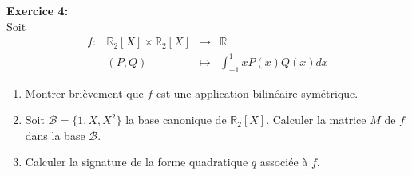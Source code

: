 \documentclass[a4paper, 11pt]{article}
\theoremstyle{plain}
\newcommand{\R}{\mathbb{R}}
\begin{document}
\bigskip
\noindent
\textbf{Exercice 4:}\\
Soit 
\[
\begin{array}{cccc}
f : & \R_2[X]\times \R_2[X] & \to & \R \\
    &  (P,Q)  & \mapsto & \int_{-1}^1 xP(x)Q(x)dx
    \end{array}
    \]
    
\begin{enumerate}
\item 
Montrer brièvement que $f$ est une application bilinéaire symétrique.
\item 
Soit $\mathcal{B} = \{ 1,X,X^2\}$ la base canonique de $ \R_2[X]$. Calculer la matrice $M$ de 
$f$ dans la base $\mathcal{B}$.
\item Calculer la signature de la forme quadratique $q$ associée à $f$.
\end{enumerate}
\end{document}
